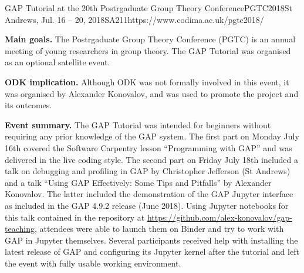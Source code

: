 \begin{event}{GAP Tutorial at the 20th Postrgaduate Group Theory Conference}{PGTC2018}{St Andrews, Jul. 16 -- 20, 2018}{SA}{21}{1}{https://www.codima.ac.uk/pgtc2018/}

\textbf{Main goals.} The Postrgaduate Group Theory Conference (PGTC) is an annual meeting of
young researchers in group theory. The GAP Tutorial was organised as an optional satellite event.

\textbf{ODK implication.} Although ODK was not formally involved in this event, it was
organised by Alexander Konovalov, and was used to promote the project and its outcomes.

\textbf{Event summary.} The GAP Tutorial was intended for beginners without requiring
any prior knowledge of the GAP system. The first part on Monday July 16th covered
the Software Carpentry lesson ``Programming with GAP'' and was delivered in the live
coding style. The second part on Friday July 18th included a talk on debugging and
profiling in GAP by Christopher Jefferson (St Andrews) and a talk
``Using GAP Effectively: Some Tips and Pitfalls'' by Alexander Konovalov. The latter
included the demonstration of the GAP Jupyter interface as included in the GAP 4.9.2
release (June 2018). Using Jupyter notebooks for this talk contained in the repository
at \url{https://github.com/alex-konovalov/gap-teaching}, attendees were able to launch
them on Binder and try to work with GAP in Jupyter themselves. Several participants
received help with installing the latest release of GAP and configuring its Jupyter
kernel after the tutorial and left the event with fully usable working environment.

\end{event}